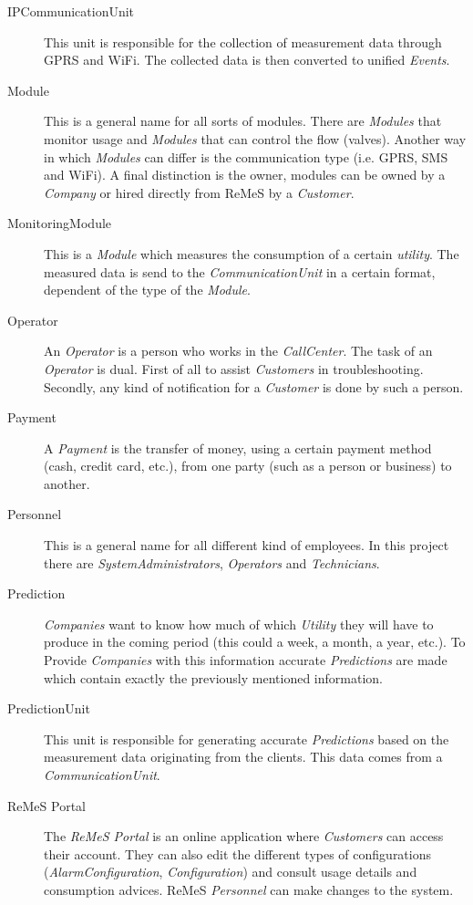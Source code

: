 \begin{description}
\item[IPCommunicationUnit] This unit is responsible for the collection of
measurement data through GPRS and WiFi. The collected data is then converted to
unified \emph{Events}.

\item[Module] This is a general name for all sorts of modules.
There are \emph{Modules} that monitor usage and \emph{Modules} that can
control the flow (valves). Another way in which \emph{Modules} can differ is the
communication type (i.e. GPRS, SMS and WiFi). A final distinction is the owner,
modules can be owned by a \emph{Company} or hired directly from ReMeS by a
\emph{Customer}.

\item[MonitoringModule] This is a \emph{Module} which measures the consumption
of a certain \emph{utility}. The measured data is send to the
\emph{CommunicationUnit} in a certain format, dependent of the type of the
\emph{Module}.

\item[Operator] An \emph{Operator} is a person who works in the
\emph{CallCenter}. The task of an \emph{Operator} is dual. First of all to assist \emph{Customers} in
troubleshooting. Secondly, any kind of notification for a \emph{Customer} is
done by such a person.

\item[Payment] A \emph{Payment} is the transfer of money, using a certain
payment method (cash, credit card, etc.), from one party (such as a person or
business) to another.

\item[Personnel] This is a general name for all different kind of employees. In
this project there are \emph{SystemAdministrators}, \emph{Operators} and
\emph{Technicians}.

\item[Prediction] \emph{Companies} want to know how much of which \emph{Utility}
they will have to produce in the coming period (this could a week, a month, a year,
etc.). To Provide \emph{Companies} with this information accurate
\emph{Predictions} are made which contain exactly the previously mentioned
information.

\item[PredictionUnit] This unit is responsible for generating accurate
\emph{Predictions} based on the measurement data originating from the clients.
This data comes from a \emph{CommunicationUnit}.

\item[ReMeS Portal] The \emph{ReMeS Portal} is an online application where
\emph{Customers} can access their account. They can also edit the different
types of configurations (\emph{AlarmConfiguration}, \emph{Configuration}) and consult
usage details and consumption advices. ReMeS \emph{Personnel} can make changes
to the system.


\end{description}
